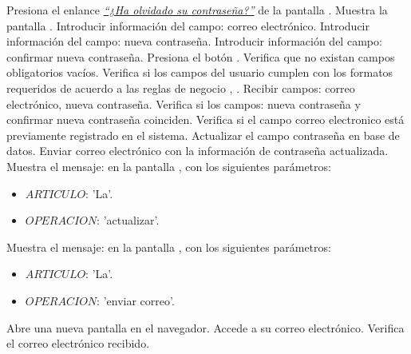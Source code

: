 \begin{UCtrayectoria}
	\UCpaso [\UCactor] Presiona el enlance \underline{\textit{“¿Ha olvidado 
	su contraseña?”}} de la pantalla .
	\UCpaso Muestra la pantalla .
	\UCpaso [\UCactor] \label{AS-CU21:introducirCorreoElectronico} Introducir 
	información del campo: correo electrónico.
	\UCpaso [\UCactor] \label{AS-CU21:introducirContrasenia} Introducir 
	información del campo: nueva contraseña.
	\UCpaso [\UCactor] \label{AS-CU21:introducirConfirmarContrasenia} 
	Introducir información del campo: confirmar nueva contraseña.
	\UCpaso [\UCactor] Presiona el botón .
	\UCpaso Verifica que no existan campos obligatorios vacíos. 
	\UCpaso Verifica si los campos del usuario cumplen con los formatos 
	requeridos de acuerdo a las reglas de negocio , 
	.   
	\UCpaso Recibir campos: correo electrónico, nueva contraseña.
	\UCpaso Verifica si los campos: nueva contraseña y confirmar nueva 
	contraseña coinciden.  %
	\UCpaso Verifica si el campo correo electronico está previamente 
	registrado en el sistema. 
	\UCpaso Actualizar el campo contraseña en base de datos.
	\UCpaso Enviar correo electrónico con la información de contraseña 
	actualizada. 
	\UCpaso Muestra el mensaje:  en la pantalla 
	, con los siguientes parámetros:
	
	\begin{itemize}
		\item $ARTICULO$: 'La'.
		\item $OPERACION$: 'actualizar'.
	\end{itemize}
	\UCpaso Muestra el mensaje:  en la pantalla 
	, con los siguientes parámetros:
	
	\begin{itemize}
		\item $ARTICULO$: 'La'.
		\item $OPERACION$: 'enviar correo'.
	\end{itemize}
	
	
	\UCpaso [\UCactor] Abre una nueva pantalla en el navegador.
	\UCpaso [\UCactor] Accede a su correo electrónico.
	\UCpaso [\UCactor] Verifica el correo electrónico recibido.
\end{UCtrayectoria}


